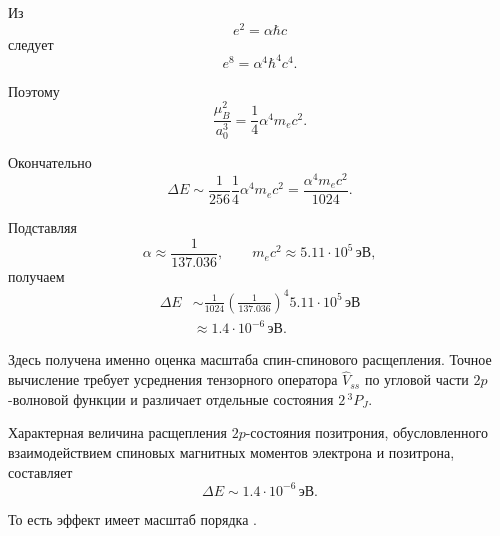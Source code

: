 \documentclass[../final.tex]{subfiles}
\begin{document}
Из
%
\begin{equation*}
    e^2
    =
    \alpha\hbar c
\end{equation*}
%
следует
%
\begin{equation*}
    e^8
    =
    \alpha^4\hbar^4c^4.
\end{equation*}

Поэтому
%
\begin{equation*}
    \frac{\mu_B^2}{a_0^3}
    =
    \frac14
    \alpha^4m_ec^2.
\end{equation*}

Окончательно
%
\begin{equation*}
    \Delta E
    \sim
    \frac{1}{256}
    \frac14
    \alpha^4m_ec^2
    =
    \frac{\alpha^4m_ec^2}{1024}.
\end{equation*}

Подставляя
%
\begin{equation*}
    \alpha
    \approx
    \frac{1}{137.036},
    \qquad
    m_ec^2
    \approx
    5.11\cdot10^5\,\text{эВ},
\end{equation*}
%
получаем
%
\begin{align*}
    \Delta E
    &\sim
    \frac{1}{1024}
    \left(
        \frac{1}{137.036}
    \right)^4
    5.11\cdot10^5\,\text{эВ}
    \\
    &\approx
    1.4\cdot10^{-6}\,\text{эВ}.
\end{align*}

\remark
Здесь получена именно оценка масштаба спин-спинового расщепления.
Точное вычисление требует усреднения тензорного оператора
$\hat V_{ss}$ по угловой части $2p$-волновой функции и различает
отдельные состояния $2\,{}^3P_J$.



\answer

Характерная величина расщепления $2p$-состояния позитрония,
обусловленного взаимодействием спиновых магнитных моментов
электрона и позитрона, составляет
%
\begin{equation*}
    \Delta E
    \sim
    1.4\cdot10^{-6}\,\text{эВ}.
\end{equation*}

То есть эффект имеет масштаб порядка .
\end{document}
